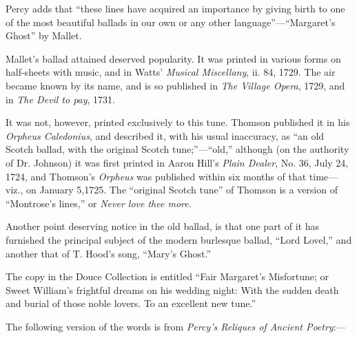Percy adds that “these lines have acquired an importance by giving birth to one
of the most beautiful ballads in our own or any other language”—“Margaret’s
Ghost” by Mallet.

Mallet’s ballad attained deserved popularity. It was printed in various forms
on half-sheets with music, and in Watts’ \textit{Musical Miscellany}, ii. 84, 1729. The
air became known by its name, and is so published in \textit{The Village Opera}, 1729,
and in \textit{The Devil to pay}, 1731.

It was not, however, printed exclusively to this tune. \pagebreak Thomson published it
in his \textit{Orpheus Caledonius}, and described it, with his usual inaccuracy, as “an
old Scotch ballad, with the original Scotch tune;”—“old,” although (on the
authority of Dr. Johnson) it was first printed in Aaron Hill’s \textit{Plain Dealer},
No. 36, July 24, 1724, and Thomson’s \textit{Orpheus} was published within six months
of that time—viz., on January 5,1725. The “original Scotch tune” of Thomson
is a version of “Montrose’s lines,” or \textit{Never love thee more}.

Another point deserving notice in the old ballad, is that one part of it has
furnished the principal subject of the modern burlesque ballad, “Lord Lovel,” and
another that of T. Hood’s song, “Mary’s Ghost.”

The copy in the Douce Collection is entitled “Fair Margaret’s Misfortune; or
Sweet William’s frightful dreams on his wedding night: With the sudden death
and burial of those noble lovers. To an excellent new tune.”

The following version of the words is from \textit{Percy’s Reliques of Ancient
Poetry}:—

\bigskip


